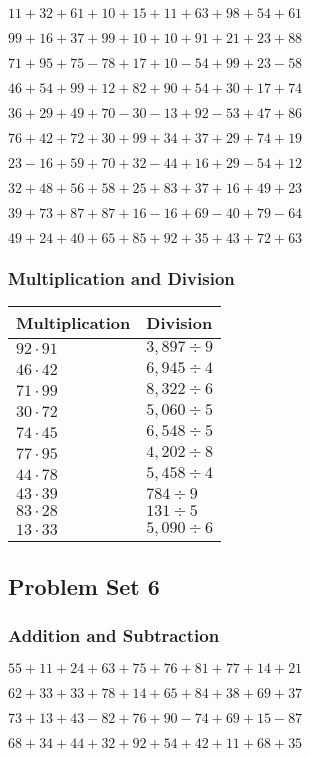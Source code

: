 \(11+32+61+10+15+11+63+98+54+ 61\)

\(99+16+37+99+10+10+91+21+23+88\)

\(71+95+75-78+17+10-54+99+23-58\)

\(46+54+99+12+82+90+54+30+17+74\)

\(36+29+49+70-30-13+92-53+47+86\)

\(76+42+72+30+99+34+37+29+74+19\)

\(23-16+59+70+32-44+16+29-54+12\)

\(32+48+56+58+25+83+37+16+49+23\)

\(39+73+87+87+16-16+69-40+79-64\)

\(49+24+40+65+85+92+35+43+72+63\)

\hypertarget{multiplication-and-division-45}{%
\subsubsection{Multiplication and
Division}\label{multiplication-and-division-45}}

\begin{longtable}[]{@{}ll@{}}
\toprule
Multiplication & Division\tabularnewline
\midrule
\endhead
\(92\cdot91\) & \(3,897÷9\)\tabularnewline
\(46\cdot42\) & \(6,945÷4\)\tabularnewline
\(71\cdot99\) & \(8,322÷6\)\tabularnewline
\(30\cdot72\) & \(5,060÷5\)\tabularnewline
\(74\cdot45\) & \(6,548÷5\)\tabularnewline
\(77\cdot95\) & \(4,202÷8\)\tabularnewline
\(44\cdot78\) & \(5,458÷4\)\tabularnewline
\(43\cdot39\) & \(784÷9\)\tabularnewline
\(83\cdot28\) & \(131÷5\)\tabularnewline
\(13\cdot33\) & \(5,090÷6\)\tabularnewline
\bottomrule
\end{longtable}

\hypertarget{problem-set-6-1}{%
\subsection{Problem Set 6}\label{problem-set-6-1}}

\hypertarget{addition-and-subtraction-46}{%
\subsubsection{Addition and
Subtraction}\label{addition-and-subtraction-46}}

\(55+11+24+63+75+76+81+77+14+ 21\)

\(62+33+33+78+14+65+84+38+69+37\)

\(73+13+43-82+76+90-74+69+15-87\)

\(68+34+44+32+92+54+42+11+68+35\)

